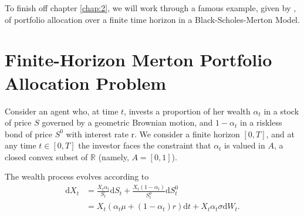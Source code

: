 To finish off chapter \ref{chap:2}, we will work through a famous example, given 
by \cite{MER69}, of portfolio allocation over a finite time horizon in a 
Black-Scholes-Merton Model.

\section{Finite-Horizon Merton Portfolio Allocation Problem}\label{sec:2.6}

Consider an agent who, at time $t$, invests a proportion of her wealth $\alpha_t$
in a stock of price $S$ governed by a geometric Brownian motion, and $1-\alpha_t$
in a riskless bond of price $S^0$ with interest rate r. We consider a finite horizon
$[0,T]$, and at any time $t\in[0,T]$ the investor faces the constraint that $\alpha_t$
is valued in $A$, a closed convex subset of $\mathbb{R}$ (namely, $A=[0,1]$).

The wealth process evolves according to 
\begin{align*}
    \mathrm dX_t&=\frac{X_t\alpha_t}{S_t}\mathrm dS_t+\frac{X_t(1-\alpha_t)}{S^0_t}\mathrm dS_t^0\\
    &=X_t(\alpha_t\mu+(1-\alpha_t)r)\mathrm dt+X_t\alpha_t\sigma\mathrm dW_t.
\end{align*}

